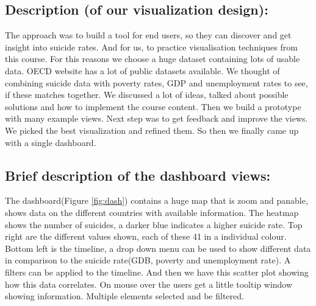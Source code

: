 \documentclass{vgtc}                          %
\begin{document}
\subsection{Description (of our visualization design):}

The approach was to build a tool for end users, so they can discover and get insight into suicide rates. And for us, to practice visualisation techniques from this course. For this reasons we choose a huge dataset containing lots of usable data. OECD website has a lot of public datasets available. We thought of combining suicide data with poverty rates, GDP and unemployment rates to see, if these matches together.
We discussed a lot of ideas, talked about possible solutions and how to implement the course content. Then we build a prototype with many example views. 
Next step was to get feedback and improve the views. We picked the best visualization and refined them. So then we finally came up with a single dashboard.


\subsection{Brief description of the dashboard views:}

The dashboard(Figure \ref{fig:dash}) contains a huge map that is zoom and panable, shows data on the different countries with available information. The heatmap shows the number of suicides, a darker blue indicates a higher suicide rate. 
Top right are the different values shown, each of these 41 in a individual colour.
Bottom left is the timeline, a drop down menu can be used to show different data in comparison to the suicide rate(GDB, poverty and unemployment rate). A filters can be applied to the timeline. And then we have this scatter plot showing how this data correlates. On mouse over the users get a little tooltip window showing information.
Multiple elements selected and be filtered.
\end{document}
